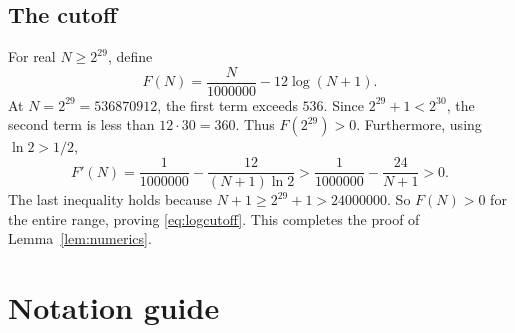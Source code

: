 \documentclass[11pt]{article}
\theoremstyle{definition}
\theoremstyle{remark}
\numberwithin{equation}{section}
\begin{document}
\subsection{The cutoff}

For real \(N\ge2^{29}\), define
\[
 F(N)=\frac N{1000000}-12\log(N+1).
\]
At \(N=2^{29}=536870912\), the first term exceeds \(536\).
Since \(2^{29}+1<2^{30}\), the second term is less than
\(12\cdot30=360\). Thus \(F(2^{29})>0\).
Furthermore, using \(\ln2>1/2\),
\[
 F'(N)=\frac1{1000000}-\frac{12}{(N+1)\ln2}
 >\frac1{1000000}-\frac{24}{N+1}>0.
\]
The last inequality holds because
\(N+1\ge2^{29}+1>24000000\).
So \(F(N)>0\) for the entire range, proving
\eqref{eq:logcutoff}.
This completes the proof of Lemma~\ref{lem:numerics}.

\section{Notation guide}\label{app:notation}
\end{document}
